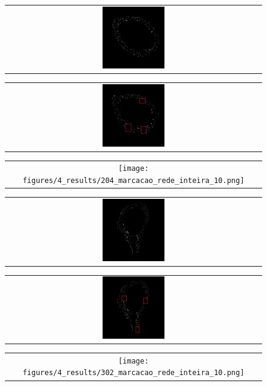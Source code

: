\begin{figure}[H]
    \center
    \begin{tabular}{@{}c@{}}
        \includegraphics[width=0.25\textwidth]{figures/4_results/204_mask_manual_lower_res.png}
        \\[\abovecaptionskip]
    \end{tabular}
    \begin{tabular}{@{}c@{}}
        \includegraphics[width=0.25\textwidth]{figures/4_results/204_net_mask_gaps_lower_res.png}
        \\[\abovecaptionskip]
    \end{tabular}
    \begin{tabular}{@{}c@{}}
        \texttt{[image: figures/4\_results/204\_marcacao\_rede\_inteira\_10.png]}
        \\[\abovecaptionskip]
    \end{tabular}

    \begin{tabular}{@{}c@{}}
        \includegraphics[width=0.25\textwidth]{figures/4_results/302_mask_manual_lower_res.png}
        \\[\abovecaptionskip]
    \end{tabular}
    \begin{tabular}{@{}c@{}}
        \includegraphics[width=0.25\textwidth]{figures/4_results/302_net_mask_gaps_lower_res.png}
        \\[\abovecaptionskip]
    \end{tabular}
    \begin{tabular}{@{}c@{}}
        \texttt{[image: figures/4\_results/302\_marcacao\_rede\_inteira\_10.png]}
        \\[\abovecaptionskip]
    \end{tabular}
  

\end{figure}
